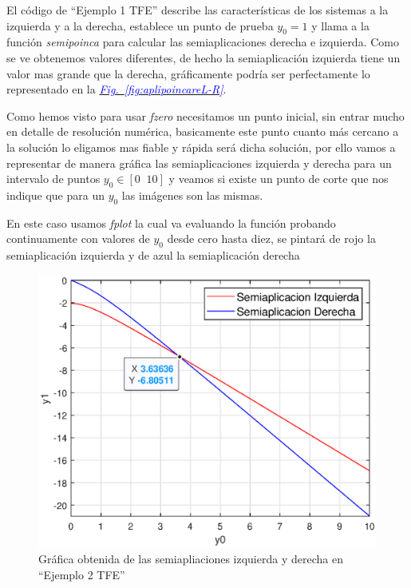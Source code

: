 \documentclass[12pt,a4paper]{report} %
\newcommand{\fref}[1]{\hyperref[#1]{\textcolor{blue}{\textit{Fig.~\ref*{#1}}}}}
\begin{document}
	\vspace{0.5cm}\noindent El código de ``Ejemplo 1 TFE'' describe las características de los sistemas a la izquierda y a la derecha, establece un punto de prueba $y_0=1$ y llama a la función \textit{semipoinca} para calcular las semiaplicaciones derecha e izquierda. Como se ve obtenemos valores diferentes, de hecho la semiaplicación izquierda tiene un valor mas grande que la derecha, gráficamente podría ser perfectamente lo representado en la \fref{fig:aplipoincareL-R}.
	\newpage
	
	Como hemos visto para usar \textit{fzero} necesitamos un punto inicial, sin entrar mucho en detalle de resolución numérica, basicamente este punto cuanto más cercano a la solución lo eligamos mas fiable y rápida será dicha solución, por ello vamos a representar de manera gráfica las semiaplicaciones izquierda y derecha para un intervalo de puntos $y_0 \in [0\;\;10]$ y veamos si existe un punto de corte que nos indique que para un $y_0$ las imágenes son las mismas.
	
	\vspace{1cm}
	
	\vspace{1cm}En este caso usamos \textit{fplot} la cual va evaluando la función probando continuamente con valores de $y_0$ desde cero hasta diez, se pintará de rojo la semiaplicación izquierda y de azul la semiaplicación derecha 
	\newpage
	
	\begin{figure}[h]
		\centering
		\includegraphics[width=1\textwidth]{ejem2_2.eps}
		\caption{Gráfica obtenida de las semiapliaciones izquierda y derecha en ``Ejemplo 2 TFE''}
		\label{fig:ejem2_2}
	\end{figure}\smallskip
	
\end{document}
